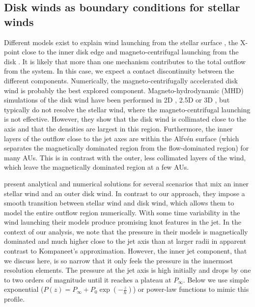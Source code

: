 \subsection{Disk winds as boundary conditions for stellar winds}
Different models exist to explain wind launching from the stellar surface \citep{1988ApJ...332L..41K,2005ApJ...632L.135M}, the X-point close to the inner disk edge \citep{1994ApJ...429..781S} and magneto-centrifugal launching from the disk \citep{1982MNRAS.199..883B,2005ApJ...630..945A}. It is likely that more than one mechanism contributes to the total outflow from the system. In this case, we expect a contact discontinuity between the different components. Numerically, the magneto-centrifugally accelerated disk wind is probably the best explored component. Magneto-hydrodynamic (MHD) simulations of the disk wind have been performed in 2D \citep[e.g.][]{2005ApJ...630..945A}, 2.5D \citep[e.g.][]{2011ApJ...728L..11R} or 3D \citep[e.g.][]{2006ApJ...653L..33A}, but typically do not resolve the stellar wind, where the magneto-centrifugal launching is not effective. However, they show that the disk wind is collimated close to the axis and that the densities are largest in this region. Furthermore, the inner layers of the outflow close to the jet axes are within the Alfv\'en surface (which separates the magnetically dominated region from the flow-dominated region) for many AUs. This is in contrast with the outer, less collimated layers of the wind, which leave the magnetically dominated region at a few AUs.

\citet{2009A&A...502..217M} present analytical and numerical solutions for several scenarios that mix an inner stellar wind and an outer disk wind. In contrast to our approach, they impose a smooth transition between stellar wind and disk wind, which allows them to model the entire outflow region numerically. With some time variability in the wind launching their models produce promising knot features in the jet. In the context of our analysis, we note that the pressure in their models is magnetically dominated and much higher close to the jet axis than at larger radii in apparent contrast to Kompaneet's approximation. However, the inner jet component, that we discuss here, is so narrow that it only feels the pressure in the innermost resolution elements. The pressure at the jet axis is high initially and drops by one to two orders of magnitude until it reaches a plateau at $P_\infty$. Below we use simple exponential ($P(z)=P_\infty+P_0\exp\left(-\frac{z}{h}\right)$) or power-law functions to mimic this profile.

